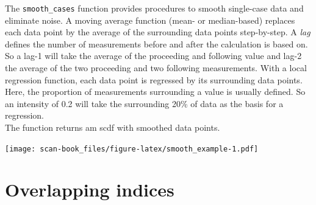 \documentclass[
]{book}
\newenvironment{Shaded}{\begin{snugshade}}{\end{snugshade}}
\newcommand{\AttributeTok}[1]{\textcolor[rgb]{0.77,0.63,0.00}{#1}}
\newcommand{\DocumentationTok}[1]{\textcolor[rgb]{0.56,0.35,0.01}{\textbf{\textit{#1}}}}
\newcommand{\FunctionTok}[1]{\textcolor[rgb]{0.00,0.00,0.00}{#1}}
\newcommand{\NormalTok}[1]{#1}
\newcommand{\OtherTok}[1]{\textcolor[rgb]{0.56,0.35,0.01}{#1}}
\newcommand{\SpecialCharTok}[1]{\textcolor[rgb]{0.00,0.00,0.00}{#1}}
\newcommand{\StringTok}[1]{\textcolor[rgb]{0.31,0.60,0.02}{#1}}
\begin{document}
The \texttt{smooth\_cases} function provides procedures to smooth single-case data and eliminate noise. A moving average function (mean- or median-based) replaces each data point by the average of the surrounding data points step-by-step. A \emph{lag} defines the number of measurements before and after the calculation is based on. So a lag-1 will take the average of the proceeding and following value and lag-2 the average of the two proceeding and two following measurements. With a local regression function, each data point is regressed by its surrounding data points. Here, the proportion of measurements surrounding a value is usually defined. So an intensity of 0.2 will take the surrounding 20\% of data as the basis for a regression.\\
The function returns am scdf with smoothed data points.

\begin{Shaded}
\end{Shaded}

\texttt{[image: scan-book\_files/figure-latex/smooth\_example-1.pdf]}

\hypertarget{overlapping-indices}{%
\chapter{Overlapping indices}\label{overlapping-indices}}
\end{document}
